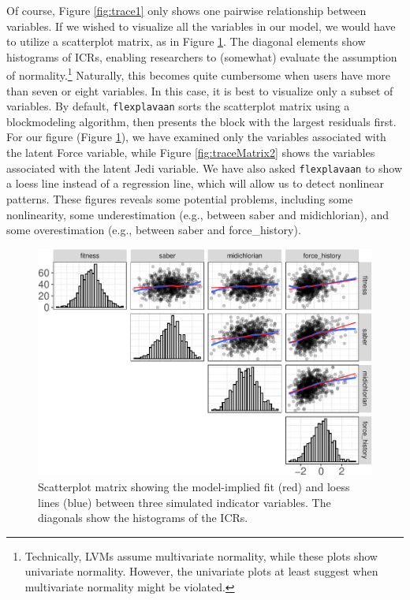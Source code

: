 \documentclass[
  english,
  doc]{apa6}
\begin{document}
Of course, Figure \ref{fig:trace1} only shows one pairwise relationship between variables. If we wished to visualize all the variables in our model, we would have to utilize a scatterplot matrix, as in Figure \ref{fig:traceMatrix}. The diagonal elements show histograms of ICRs, enabling researchers to (somewhat) evaluate the assumption of normality.\footnote{Technically, LVMs assume multivariate normality, while these plots show univariate normality. However, the univariate plots at least suggest when multivariate normality might be violated.} Naturally, this becomes quite cumbersome when users have more than seven or eight variables. In this case, it is best to visualize only a subset of variables. By default, \texttt{flexplavaan} sorts the scatterplot matrix using a blockmodeling algorithm, then presents the block with the largest residuals first. For our figure (Figure \ref{fig:traceMatrix}), we have examined only the variables associated with the latent Force variable, while Figure \ref{fig:traceMatrix2} shows the variables associated with the latent Jedi variable. We have also asked \texttt{flexplavaan} to show a loess line instead of a regression line, which will allow us to detect nonlinear patterns. These figures reveals some potential problems, including some nonlinearity, some underestimation (e.g., between saber and midichlorian), and some overestimation (e.g., between saber and force\_history).

\begin{figure}
\centering
\includegraphics{flexplavaan_draft_files/figure-latex/traceMatrix-1.pdf}
\caption{\label{fig:traceMatrix}Scatterplot matrix showing the model-implied fit (red) and loess lines (blue) between three simulated indicator variables. The diagonals show the histograms of the ICRs.}
\end{figure}
\end{document}
